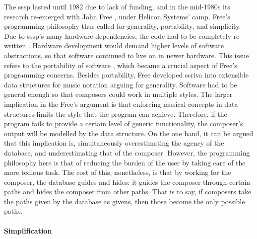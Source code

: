 	The \gls{sssp} lasted until 1982 due to lack of funding, and in the mid-1980s its research re-emerged with John Free \parencite{icmc/bbp2372.1987.046}, under Helicon Systems' \gls{camp}. Free's programming philosophy thus called for generality, portability, and simplicity. Due to \gls{sssp}'s many hardware dependencies, the code had to be completely re-written \parencite{DBLP:conf/icmc/FreeV86}. Hardware development would demand higher levels of software abstractions, so that software continued to live on in newer hardware. This issue refers to the portability of software , which became a crucial aspect of Free's programming concerns. Besides portability, Free developed \gls{scriva} into extensible data structures for music notation arguing for  generality. Software had to be general enough so that composers could work in multiple styles. The larger implication in the Free's argument is that enforcing musical concepts in data structures limits the style that the program can achieve. Therefore, if the program fails to provide a certain level of generic functionality, the composer's output will be modelled by the data structure. On the one hand, it can be argued that this implication is, simultaneously overestimating the agency of the database, and underestimating that of the composer. However, the programming philosophy here is that of reducing the burden of the user by taking care of the more tedious task. The cost of this, nonetheless, is that by working for the composer, the database guides and hides: it guides the composer through certain paths and hides the composer from other paths. That is to say, if composers take the paths given by the database as givens, then those become the only possible paths.

	\paragraph{Simplification}
	\label{computer:vanilla}

